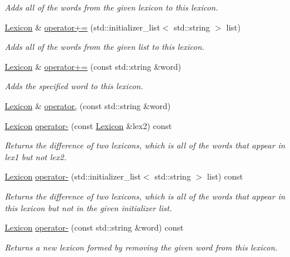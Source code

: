 \begin{DoxyCompactItemize}
\begin{DoxyCompactList}\small\item\em Adds all of the words from the given lexicon to this lexicon. \end{DoxyCompactList}\item 
\mbox{\hyperlink{classLexicon}{Lexicon}} \& \mbox{\hyperlink{classLexicon_a3080ac30a072160945adc5f860ca1785}{operator+=}} (std\+::initializer\+\_\+list$<$ std\+::string $>$ list)
\begin{DoxyCompactList}\small\item\em Adds all of the words from the given list to this lexicon. \end{DoxyCompactList}\item 
\mbox{\hyperlink{classLexicon}{Lexicon}} \& \mbox{\hyperlink{classLexicon_a051f30ebfa7b8fbb7ea1dc5af23d3004}{operator+=}} (const std\+::string \&word)
\begin{DoxyCompactList}\small\item\em Adds the specified word to this lexicon. \end{DoxyCompactList}\item 
\mbox{\hyperlink{classLexicon}{Lexicon}} \& \mbox{\hyperlink{classLexicon_a75f32eb2f65c3c3968193cfd72bdfd1a}{operator,}} (const std\+::string \&word)
\item 
\mbox{\hyperlink{classLexicon}{Lexicon}} \mbox{\hyperlink{classLexicon_a487624601a6357e1b6d64053f9ebb5e2}{operator-\/}} (const \mbox{\hyperlink{classLexicon}{Lexicon}} \&lex2) const
\begin{DoxyCompactList}\small\item\em Returns the difference of two lexicons, which is all of the words that appear in {\ttfamily lex1} but not {\ttfamily lex2}. \end{DoxyCompactList}\item 
\mbox{\hyperlink{classLexicon}{Lexicon}} \mbox{\hyperlink{classLexicon_a0cd415d08567bfae9eae12afe2169cb5}{operator-\/}} (std\+::initializer\+\_\+list$<$ std\+::string $>$ list) const
\begin{DoxyCompactList}\small\item\em Returns the difference of two lexicons, which is all of the words that appear in this lexicon but not in the given initializer list. \end{DoxyCompactList}\item 
\mbox{\hyperlink{classLexicon}{Lexicon}} \mbox{\hyperlink{classLexicon_a14c8fea4b958b02ea5ee55d5509db8e6}{operator-\/}} (const std\+::string \&word) const
\begin{DoxyCompactList}\small\item\em Returns a new lexicon formed by removing the given word from this lexicon. \end{DoxyCompactList}\item 

\end{DoxyCompactItemize}
